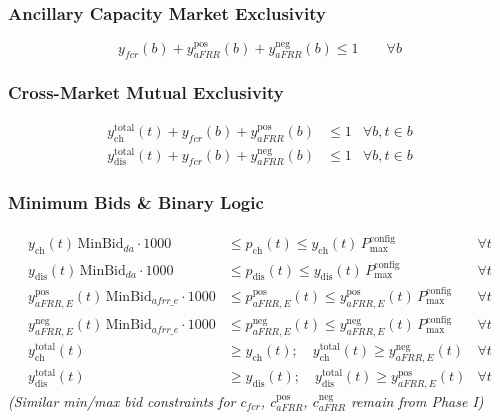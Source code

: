 \documentclass[11pt, a4paper]{article}
\begin{document}
\subsubsection{Ancillary Capacity Market Exclusivity}
\begin{equation}
    y_{fcr}(b) + y^{\mathrm{pos}}_{aFRR}(b) + y^{\mathrm{neg}}_{aFRR}(b) \le 1 \qquad \forall b
\end{equation}

\subsubsection{Cross-Market Mutual Exclusivity}
\begin{align}
    y^{\mathrm{total}}_{\mathrm{ch}}(t) + y_{fcr}(b) + y^{\mathrm{pos}}_{aFRR}(b) &\le 1 & \forall b, t \in b \\
    y^{\mathrm{total}}_{\mathrm{dis}}(t) + y_{fcr}(b) + y^{\mathrm{neg}}_{aFRR}(b) &\le 1 & \forall b, t \in b
\end{align}

\subsubsection{Minimum Bids \& Binary Logic}
\begin{align}
    y_{\mathrm{ch}}(t)\,\text{MinBid}_{da} \cdot 1000 &\le p_{\mathrm{ch}}(t) \le y_{\mathrm{ch}}(t)\,P^{\mathrm{config}}_{\max} & \forall t \\
    y_{\mathrm{dis}}(t)\,\text{MinBid}_{da} \cdot 1000 &\le p_{\mathrm{dis}}(t) \le y_{\mathrm{dis}}(t)\,P^{\mathrm{config}}_{\max} & \forall t \\
    y^{\mathrm{pos}}_{aFRR,E}(t)\,\text{MinBid}_{afrr\_e} \cdot 1000 &\le p^{\mathrm{pos}}_{aFRR,E}(t) \le y^{\mathrm{pos}}_{aFRR,E}(t)\,P^{\mathrm{config}}_{\max} & \forall t \\
    y^{\mathrm{neg}}_{aFRR,E}(t)\,\text{MinBid}_{afrr\_e} \cdot 1000 &\le p^{\mathrm{neg}}_{aFRR,E}(t) \le y^{\mathrm{neg}}_{aFRR,E}(t)\,P^{\mathrm{config}}_{\max} & \forall t \\
    y^{\mathrm{total}}_{\mathrm{ch}}(t) &\ge y_{\mathrm{ch}}(t); \quad y^{\mathrm{total}}_{\mathrm{ch}}(t) \ge y^{\mathrm{neg}}_{aFRR,E}(t) & \forall t \\
    y^{\mathrm{total}}_{\mathrm{dis}}(t) &\ge y_{\mathrm{dis}}(t); \quad y^{\mathrm{total}}_{\mathrm{dis}}(t) \ge y^{\mathrm{pos}}_{aFRR,E}(t) & \forall t
\end{align}
\textit{(Similar min/max bid constraints for $c_{fcr}$, $c^{\mathrm{pos}}_{aFRR}$, $c^{\mathrm{neg}}_{aFRR}$ remain from Phase I)}
\end{document}

